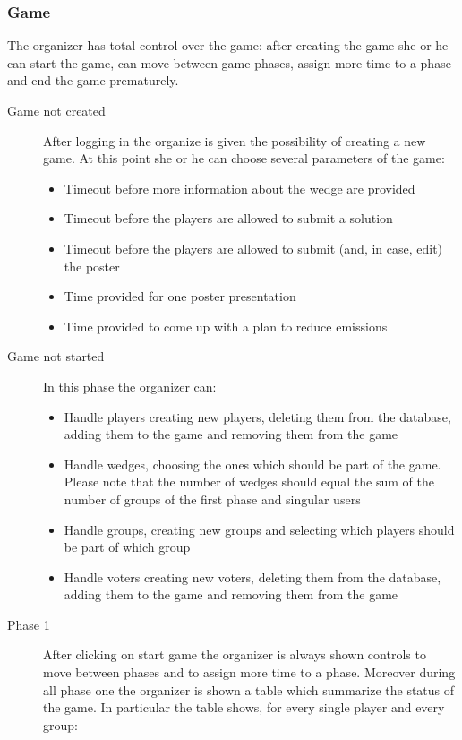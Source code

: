 \subsubsection{Game}
The organizer has total control over the game: after creating the game she or he can start the game, can move between game phases, assign more time to a phase and end the game prematurely.
\begin{description}
	\item[Game not created] After logging in the organize is given the possibility of creating a new game. At this point she or he can choose several parameters of the game:
		\begin{itemize}
		\item Timeout before more information about the wedge are provided
		\item Timeout before the players are allowed to submit a solution
		\item Timeout before the players are allowed to submit (and, in case, edit) the poster
		\item Time provided for one poster presentation
		\item Time provided to come up with a plan to reduce emissions
		\end{itemize}
	\item[Game not started] In this phase the organizer can:
		\begin{itemize}
		\item Handle players creating new players, deleting them from the database, adding them to the game and removing them from the game
		\item Handle wedges, choosing the ones which should be part of the game. Please note that the number of wedges should equal the sum of the number of groups of the first phase and singular users
		\item Handle groups, creating new groups and selecting which players should be part of which group
		\item Handle voters creating new voters, deleting them from the database, adding them to the game and removing them from the game
		\end{itemize}	
	\item[Phase 1] After clicking on start game the organizer is always shown controls to move between phases and to assign more time to a phase. Moreover during all phase one the organizer is shown a table which summarize the status of the game. In particular the table shows, for every single player and every group:
	\begin{itemize}

\end{itemize}
\end{description}
